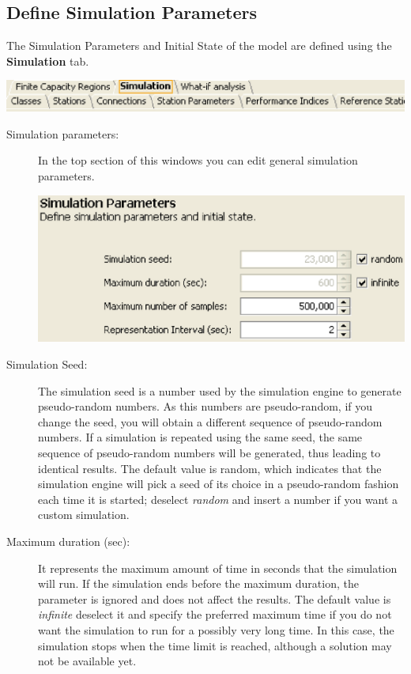\begin{description*}
\subsection{Define Simulation Parameters}
\label{sec:DefineSimulationParameters}
The Simulation Parameters and Initial State of the model are defined using the \textbf{Simulation} tab.
\begin{center}
\includegraphics[scale=.5]{img/jsim/sim_tabs.eps}
\end{center}
\begin{description}
\item [Simulation parameters:] In the top section of this windows you can edit general simulation parameters.
\begin{center}
\includegraphics[scale=.5]{img/jsim/first_section.eps}
\end{center}
\item [Simulation Seed:] The simulation seed is a number used by the simulation engine to generate pseudo-random numbers. As this numbers are pseudo-random, if you change the seed, you will obtain a different sequence of pseudo-random numbers. If a simulation is repeated using the same seed, the same sequence of pseudo-random numbers will be generated, thus leading to identical results. The default value is random, which indicates that the simulation engine will pick a seed of its choice in a pseudo-random fashion each time it is started; deselect \emph{random} and insert a number if you want a custom simulation.
\item[Maximum duration (sec):] It represents the maximum amount of time in seconds that the simulation will run. If the simulation ends before the maximum duration, the parameter is ignored and does not affect the results. The default value is \emph{infinite} deselect it and specify the preferred maximum time if you do not want the simulation to run for a possibly very long time. In this case, the simulation stops when the time limit is reached, although a solution may not be available yet.

\end{description}
\end{description*}
